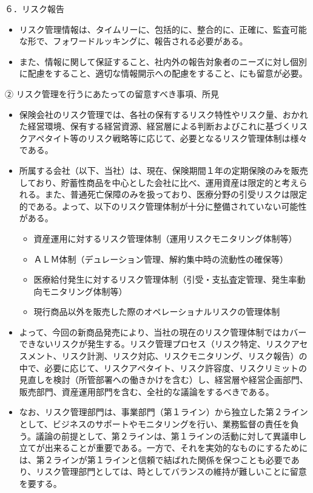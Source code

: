 \documentclass[report,gutter=10mm,fore-edge=10mm,uplatex,dvipdfmx]{jlreq}
\begin{document}
６．リスク報告
\begin{itemize}
\item[] リスク管理情報は、タイムリーに、包括的に、整合的に、正確に、監査可能な形で、フォワードルッキングに、報告される必要がある。
\item[] また、情報に関して保証すること、社内外の報告対象者のニーズに対し個別に配慮をすること、適切な情報開示への配慮をすること、にも留意が必要。
\end{itemize}

② リスク管理を行うにあたっての留意すべき事項、所見

\begin{itemize}
\item[] 保険会社のリスク管理では、各社の保有するリスク特性やリスク量、おかれた経営環境、保有する経営資源、経営層による判断およびこれに基づくリスクアペタイト等のリスク戦略等に応じて、必要となるリスク管理体制は様々である。
\item[] 所属する会社（以下、当社）は、現在、保険期間１年の定期保険のみを販売しており、貯蓄性商品を中心とした会社に比べ、運用資産は限定的と考えられる。また、普通死亡保障のみを扱っており、医療分野の引受リスクは限定的である。よって、以下のリスク管理体制が十分に整備されていない可能性がある。
\begin{itemize}
\item[] 資産運用に対するリスク管理体制（運用リスクモニタリング体制等）
\item[] ＡＬＭ体制（デュレーション管理、解約集中時の流動性の確保等）
\item[] 医療給付発生に対するリスク管理体制（引受・支払査定管理、発生率動向モニタリング体制等）
\item[] 現行商品以外を販売した際のオペレーショナルリスクの管理体制
\end{itemize}
\item[]  よって、今回の新商品発売により、当社の現在のリスク管理体制ではカバーできないリスクが発生する。リスク管理プロセス（リスク特定、リスクアセスメント、リスク計測、リスク対応、リスクモニタリング、リスク報告）の中で、必要に応じて、リスクアペタイト、リスク許容度、リスクリミットの見直しを検討（所管部署への働きかけを含む）し、経営層や経営企画部門、販売部門、資産運用部門を含む、全社的な議論をするべきである。
\item[]  なお、リスク管理部門は、事業部門（第１ライン）から独立した第２ラインとして、ビジネスのサポートやモニタリングを行い、業務監督の責任を負う。議論の前提として、第２ラインは、第１ラインの活動に対して異議申し立てが出来ることが重要である。一方で、それを実効的なものにするためには、第２ラインが第１ラインと信頼で結ばれた関係を保つことも必要であり、リスク管理部門としては、時としてバランスの維持が難しいことに留意を要する。
\end{itemize}
\end{document}
